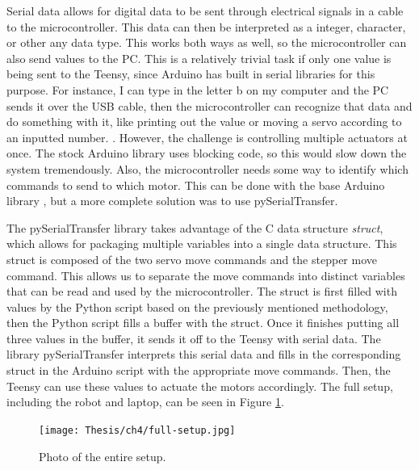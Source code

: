 Serial data allows for digital data to be sent through electrical signals in a cable to the microcontroller. This data can then be interpreted as a integer, character, or other any data type. This works both ways as well, so the microcontroller can also send values to the PC. This is a relatively trivial task if only one value is being sent to the Teensy, since Arduino has built in serial libraries for this purpose. For instance, I can type in the letter b on my computer and the PC sends it over the USB cable, then the microcontroller can recognize that data and do something with it, like printing out the value or moving a servo according to an inputted number. \cite{ansh2919SerialCommunicationPython2021}\cite{detheFaceTrackingOpenCV2019}. However, the challenge is controlling multiple actuators at once. The stock Arduino library uses blocking code, so this would slow down the system tremendously. Also, the microcontroller needs some way to identify which commands to send to which motor. This can be done with the base Arduino library \cite{robin2SerialInputBasics2016}, but a more complete solution was to use pySerialTransfer.

The pySerialTransfer library takes advantage of the C data structure \emph{struct}, which allows for packaging multiple variables into a single data structure. This struct is composed of the two servo move commands and the stepper move command. This allows us to separate the move commands into distinct variables that can be read and used by the microcontroller. The struct is first filled with values by the Python script based on the previously mentioned methodology, then the Python script fills a buffer with the struct. Once it finishes putting all three values in the buffer, it sends it off to the Teensy with serial data. The library pySerialTransfer interprets this serial data and fills in the corresponding struct in the Arduino script with the appropriate move commands. Then, the Teensy can use these values to actuate the motors accordingly. The full setup, including the robot and laptop, can be seen in Figure \ref{fig:complete-setup}.

\begin{figure}[h]
    \centering
    \texttt{[image: Thesis/ch4/full-setup.jpg]}
    \caption{Photo of the entire setup.}
    \label{fig:complete-setup}
\end{figure}